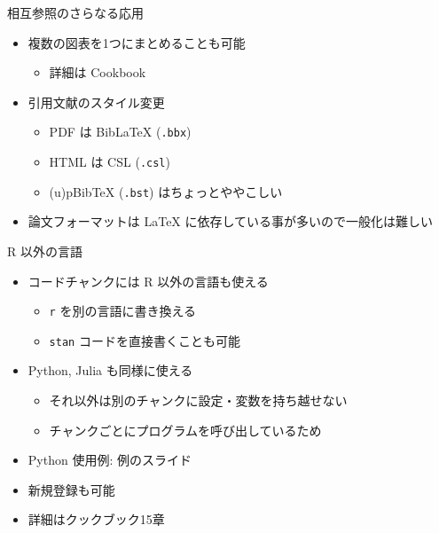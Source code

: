 \documentclass[
  ignorenonframetext,
]{beamer}
\providecommand{\tightlist}{%
  \setlength{\itemsep}{0pt}\setlength{\parskip}{0pt}}
\begin{document}
\begin{frame}[fragile]{相互参照のさらなる応用}
\protect\hypertarget{ux76f8ux4e92ux53c2ux7167ux306eux3055ux3089ux306aux308bux5fdcux7528}{}
\begin{itemize}
\item
  複数の図表を1つにまとめることも可能

  \begin{itemize}
  \tightlist
  \item
    詳細は Cookbook
  \end{itemize}
\item
  引用文献のスタイル変更

  \begin{itemize}
  \tightlist
  \item
    PDF は BibLaTeX (\texttt{.bbx})
  \item
    HTML は CSL (\texttt{.csl})
  \item
    (u)pBibTeX (\texttt{.bst}) はちょっとややこしい
  \end{itemize}
\item
  論文フォーマットは LaTeX に依存している事が多いので一般化は難しい
\end{itemize}
\end{frame}

\begin{frame}[fragile]{R 以外の言語}
\protect\hypertarget{r-ux4ee5ux5916ux306eux8a00ux8a9e}{}
\begin{itemize}
\item
  コードチャンクには R 以外の言語も使える

  \begin{itemize}
  \tightlist
  \item
    \texttt{r} を別の言語に書き換える
  \item
    \texttt{stan} コードを直接書くことも可能
  \end{itemize}
\item
  Python, Julia も同様に使える

  \begin{itemize}
  \tightlist
  \item
    それ以外は別のチャンクに設定・変数を持ち越せない
  \item
    チャンクごとにプログラムを呼び出しているため
  \end{itemize}
\item
  Python 使用例: 例のスライド
\item
  新規登録も可能
\item
  詳細はクックブック15章
\end{itemize}
\end{frame}
\end{document}
